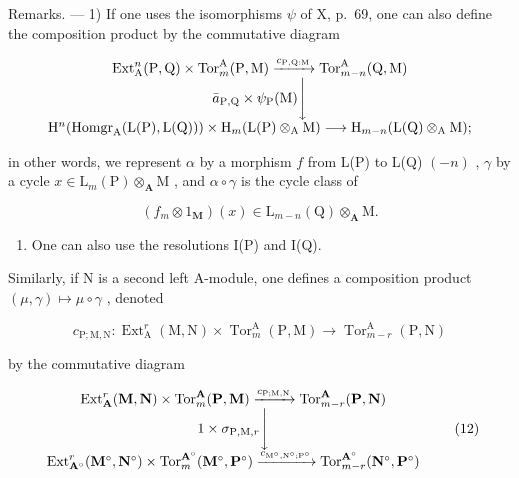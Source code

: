 Remarks. --- 1) If one uses the isomorphisms \(\psi\) of X, p.~69, one can also define the composition product by the commutative diagram

\[
\begin{array}{c} \operatorname{Ext} _ {\mathrm{A}} ^ {n} (\mathrm{P}, \mathrm{Q}) \times \operatorname{Tor} _ {m} ^ {\mathrm{A}} (\mathrm{P}, \mathrm{M}) \xrightarrow {c _ {\mathrm{P} , \mathrm{Q} : \mathrm{M}}} \operatorname{Tor} _ {m - n} ^ {\mathrm{A}} (\mathrm{Q}, \mathrm{M}) \\ \bar {a} _ {\mathrm{P}, \mathrm{Q}} \times \psi_ {\mathrm{P}} (\mathrm{M}) \Biggl \downarrow \\ \mathrm{H} ^ {n} (\operatorname{Homgr} _ {\mathrm{A}} (\mathrm{L} (\mathrm{P}), \mathrm{L} (\mathrm{Q}))) \times \mathrm{H} _ {m} (\mathrm{L} (\mathrm{P}) \otimes_ {\mathrm{A}} \mathrm{M}) \longrightarrow \mathrm{H} _ {m - n} (\mathrm{L} (\mathrm{Q}) \otimes_ {\mathrm{A}} \mathrm{M}); \end{array}
\]

in other words, we represent \(\alpha\) by a morphism \(f\) from L(P) to L(Q) \((-n)\) , \(\gamma\) by a cycle \(x \in \mathrm{L}_{m}(\mathrm{P}) \otimes_{\mathbf{A}} \mathrm{M}\) , and \(\alpha \circ \gamma\) is the cycle class of

\[
\left(f _ {m} \otimes 1 _ {\mathbf {M}}\right) (x) \in \mathrm{L} _ {m - n} (\mathrm{Q}) \otimes_ {\mathbf {A}} \mathrm{M}.
\]

\begin{enumerate}
\def\labelenumi{\arabic{enumi})}
\setcounter{enumi}{1}
\tightlist
\item
  One can also use the resolutions I(P) and I(Q).
\end{enumerate}

Similarly, if N is a second left A-module, one defines a composition product \((\mu, \gamma) \mapsto \mu \circ \gamma\) , denoted

\[
c _ {\mathrm{P}; \mathrm{M}, \mathrm{N}}: \operatorname{Ext} _ {\mathrm{A}} ^ {r} (\mathrm{M}, \mathrm{N}) \times \operatorname{Tor} _ {m} ^ {\mathrm{A}} (\mathrm{P}, \mathrm{M}) \rightarrow \operatorname{Tor} _ {m - r} ^ {\mathrm{A}} (\mathrm{P}, \mathrm{N})
\]

by the commutative diagram

\[
\begin{array}{c} \operatorname{Ext} _ {\mathbf {A}} ^ {r} (\mathbf {M}, \mathbf {N}) \times \operatorname{Tor} _ {m} ^ {\mathbf {A}} (\mathbf {P}, \mathbf {M}) \xrightarrow {c _ {\mathrm{P} ; \mathrm{M} , \mathrm{N}}} \operatorname{Tor} _ {m - r} ^ {\mathbf {A}} (\mathbf {P}, \mathbf {N}) \\ 1 \times \sigma_ {\mathrm{P}, \mathrm{M}, r} \Biggl \downarrow \\ \operatorname{Ext} _ {\mathbf {A} ^ {\circ}} ^ {r} (\mathbf {M} ^ {\circ}, \mathbf {N} ^ {\circ}) \times \operatorname{Tor} _ {m} ^ {\mathbf {A} ^ {\circ}} (\mathbf {M} ^ {\circ}, \mathbf {P} ^ {\circ}) \xrightarrow {c _ {\mathrm{M} ^ {\circ} , \mathrm{N} ^ {\circ} ; \mathrm{P} ^ {\circ}}} \operatorname{Tor} _ {m - r} ^ {\mathbf {A} ^ {\circ}} (\mathbf {N} ^ {\circ}, \mathbf {P} ^ {\circ}) \end{array}\tag{12}
\]

